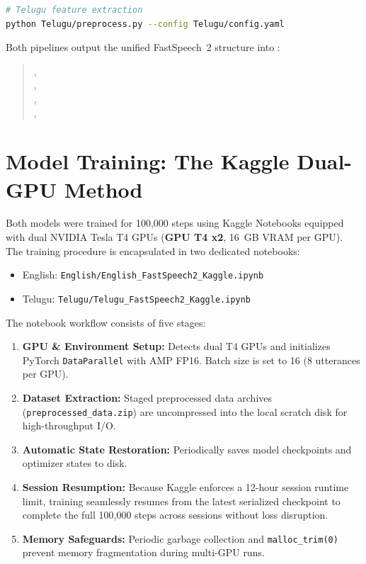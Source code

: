 \documentclass[11pt,a4paper]{report}
\begin{document}
\begin{enumerate}
\begin{lstlisting}[language=bash]
# Telugu feature extraction
python Telugu/preprocess.py --config Telugu/config.yaml
\end{lstlisting}
    Both pipelines output the unified FastSpeech~2 structure into :
    \begin{quote}
    , \\
    , \\
    , \\
    , 
    \end{quote}
\end{enumerate}

\section{Model Training: The Kaggle Dual-GPU Method}
Both models were trained for 100{,}000 steps using Kaggle Notebooks equipped with dual NVIDIA Tesla T4 GPUs (\textbf{GPU T4 x2}, 16~GB VRAM per GPU). The training procedure is encapsulated in two dedicated notebooks:
\begin{itemize}
    \item English: \texttt{English/English\_FastSpeech2\_Kaggle.ipynb}
    \item Telugu: \texttt{Telugu/Telugu\_FastSpeech2\_Kaggle.ipynb}
\end{itemize}

The notebook workflow consists of five stages:
\begin{enumerate}
    \item \textbf{GPU \& Environment Setup:} Detects dual T4 GPUs and initializes PyTorch \texttt{DataParallel} with AMP FP16. Batch size is set to 16 (8 utterances per GPU).
    \item \textbf{Dataset Extraction:} Staged preprocessed data archives (\texttt{preprocessed\_data.zip}) are uncompressed into the local scratch disk for high-throughput I/O.
    \item \textbf{Automatic State Restoration:} Periodically saves model checkpoints and optimizer states to disk.
    \item \textbf{Session Resumption:} Because Kaggle enforces a 12-hour session runtime limit, training seamlessly resumes from the latest serialized checkpoint to complete the full 100{,}000 steps across sessions without loss disruption.
    \item \textbf{Memory Safeguards:} Periodic garbage collection and \texttt{malloc\_trim(0)} prevent memory fragmentation during multi-GPU runs.
\end{enumerate}
\end{document}
